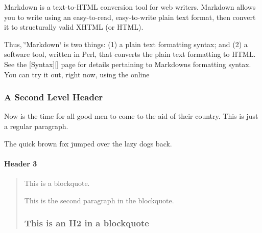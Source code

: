 Markdown is a text-\/to-\/\+H\+T\+M\+L conversion tool for web writers. Markdown allows you to write using an easy-\/to-\/read, easy-\/to-\/write plain text format, then convert it to structurally valid X\+H\+T\+M\+L (or H\+T\+M\+L).

Thus, \char`\"{}\+Markdown\char`\"{} is two things\+: (1) a plain text formatting syntax; and (2) a software tool, written in Perl, that converts the plain text formatting to H\+T\+M\+L. See the [Syntax][] page for details pertaining to Markdown\textquotesingle{}s formatting syntax. You can try it out, right now, using the online

\subsubsection*{A Second Level Header }

Now is the time for all good men to come to the aid of their country. This is just a regular paragraph.

The quick brown fox jumped over the lazy dog\textquotesingle{}s back.

\paragraph*{Header 3}

\begin{quote}
This is a blockquote.

This is the second paragraph in the blockquote.

\subsubsection*{This is an H2 in a blockquote}

\end{quote}
